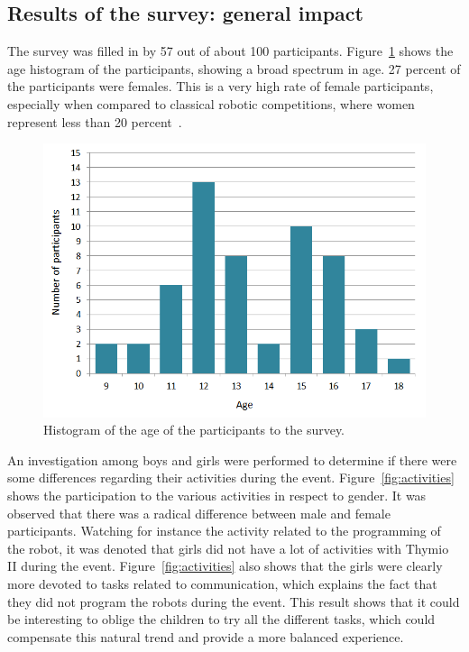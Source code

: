 \documentclass{intech-journal}
\begin{document}
\subsection{Results of the survey: general impact}

The survey was filled in by 57 out of about 100 participants. 
Figure~\ref{fig:age} shows the age histogram of the participants, showing a broad spectrum in age.
27 percent of the participants were females.
This is a very high rate of female participants, especially when compared to classical robotic competitions, where women represent less than 20 percent~\cite{riedo2013upgrade}.

\begin{figure}[ht]
 \centering
    \includegraphics[width=0.5\columnwidth]{figures/Age.png}
  \caption{Histogram of the age of the participants to the survey.}
  \label{fig:age} 
\end{figure}

An investigation among boys and girls were performed to determine if there were some differences regarding their activities during the event.
Figure~\ref{fig:activities} shows the participation to the various activities in respect to gender. 
It was observed that there was a radical difference between male and female participants. 
Watching for instance the activity related to the programming of the robot, it was denoted that girls did not have a lot of activities with Thymio II during the event. 
Figure~\ref{fig:activities} also shows that the girls were clearly more devoted to tasks related to communication, which explains the fact that they did not program the robots during the event. 
This result shows that it could be interesting to oblige the children to try all the different tasks, which could compensate this natural trend and provide a more balanced experience.
\end{document}
